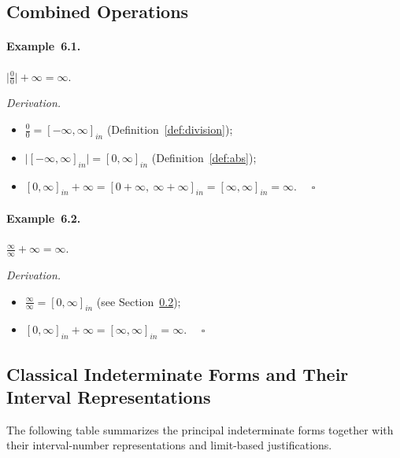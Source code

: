 \documentclass[11pt,a4paper]{article}
\theoremstyle{paperdef}
\newcommand{\inI}[1]{[#1]_{in}}
\begin{document}
\subsection{Combined Operations}

\paragraph{Example~6.1.}
$\lvert \tfrac{0}{0} \rvert + \infty = \infty.$

\emph{Derivation.}
\begin{itemize}[leftmargin=2em]
  \item $\tfrac{0}{0} = \inI{-\infty, \infty}$
    (Definition~\ref{def:division});
  \item $\lvert \inI{-\infty, \infty} \rvert = \inI{0, \infty}$
    (Definition~\ref{def:abs});
  \item $\inI{0, \infty} + \infty
    = \inI{0 + \infty,\ \infty + \infty}
    = \inI{\infty, \infty} = \infty$. $\quad\square$
\end{itemize}

\paragraph{Example~6.2.}
$\tfrac{\infty}{\infty} + \infty = \infty.$

\emph{Derivation.}
\begin{itemize}[leftmargin=2em]
  \item $\tfrac{\infty}{\infty} = \inI{0, \infty}$
    (see Section~\ref{sec:classical-forms});
  \item $\inI{0, \infty} + \infty = \inI{\infty, \infty} = \infty$.
    $\quad\square$
\end{itemize}

\subsection{Classical Indeterminate Forms and Their Interval Representations}\label{sec:classical-forms}

The following table summarizes the principal indeterminate forms
together with their interval-number representations and limit-based
justifications.
\end{document}
